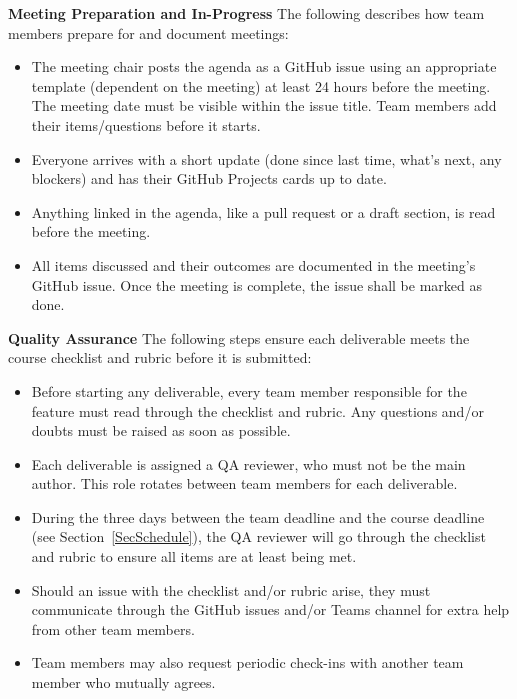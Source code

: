 \documentclass{article}
\begin{document}
\textbf{Meeting Preparation and In-Progress} \newline
The following describes how team members prepare for and document meetings:
\begin{itemize}
    \item The meeting chair posts the agenda as a GitHub issue using an appropriate template (dependent on the meeting) at least 24 hours before the meeting. The meeting date must be visible within the issue title. Team members add their items/questions before it starts.
    \item Everyone arrives with a short update (done since last time, what's next, any blockers) and has their GitHub Projects cards up to date.
    \item Anything linked in the agenda, like a pull request or a draft section, is read before the meeting.
    \item All items discussed and their outcomes are documented in the meeting's GitHub issue. Once the meeting is complete, the issue shall be marked as done.
\end{itemize}

\label{sec:quality-assurance}\textbf{Quality Assurance} \newline
The following steps ensure each deliverable meets the course checklist and rubric before it is submitted:
\begin{itemize}
    \item Before starting any deliverable, every team member responsible for the feature must read through the checklist and rubric. Any questions and/or doubts must be raised as soon as possible.
    \item Each deliverable is assigned a QA reviewer, who must not be the main author. This role rotates between team members for each deliverable.
    \item During the three days between the team deadline and the course deadline (see Section~\ref{SecSchedule}), the QA reviewer will go through the checklist and rubric to ensure all items are at least being met.
    \item Should an issue with the checklist and/or rubric arise, they must communicate through the GitHub issues and/or Teams channel for extra help from other team members.
    \item Team members may also request periodic check-ins with another team member who mutually agrees.
\end{itemize}
\end{document}
